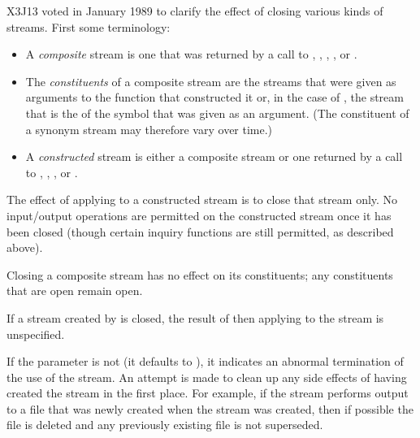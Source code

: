 \begin{defun}[Function]
\begin{new}
X3J13 voted in January 1989
to clarify the effect of closing various
kinds of streams.  First some terminology:
\begin{itemize}
\item
A {\it composite} stream is one that was returned by a call to
,
,
,
,
or .

\item
The {\it constituents} of a composite stream are the streams that were given
as arguments to the function that constructed it or, in the case of
, the stream that is the  of
the symbol that was given as an argument.  (The constituent of
a synonym stream may therefore vary over time.)

\item
A {\it constructed} stream is either a composite stream or one returned
by a call to , ,
, or
.
\end{itemize}

The effect of applying  to a constructed stream is to close
that stream only.  No input/output operations are permitted on the
constructed stream once it has been closed (though certain inquiry
functions are still permitted, as described above).

Closing a composite stream has no effect on its constituents;
any constituents that are open remain open.

If a stream created by  is closed,
the result of then applying  to the
stream is unspecified.
\end{new}

If the  parameter is not {\false} (it defaults to {\false}), it
indicates an abnormal termination of the use of the stream.  An attempt
is made to clean up any side effects of having created the stream in the
first place.  For example, if the stream performs output to a file
that was newly created when the stream was created, then if possible the
file is deleted and any previously existing file is not superseded.
\end{defun}


